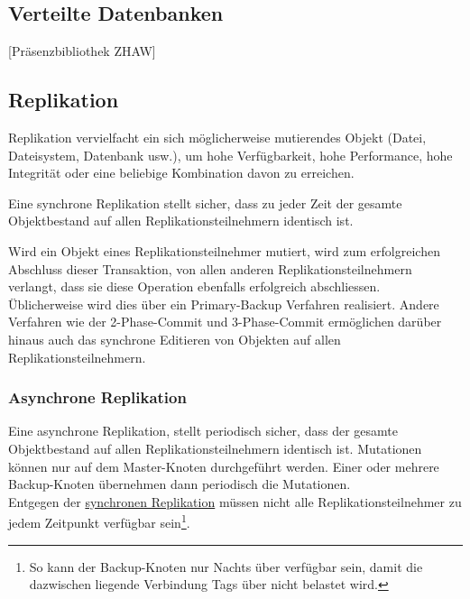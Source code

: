 \documentclass[oneside,11pt,parskip=half,ngerman]{scrreprt}
\begin{document}
\subsection{Verteilte Datenbanken}\label{verteilte-datenbanken}

{[}Präsenzbibliothek ZHAW{]}

\subsection{Replikation}\label{replikation}

Replikation vervielfacht ein sich möglicherweise mutierendes Objekt
(Datei, Dateisystem, Datenbank usw.), um hohe Verfügbarkeit, hohe
Performance, hohe Integrität oder eine beliebige Kombination davon zu
erreichen. \autocite[ p.~19]{SWB-327013990}


Eine synchrone Replikation stellt sicher, dass zu jeder Zeit der gesamte
Objektbestand auf allen Replikationsteilnehmern identisch ist.

Wird ein Objekt eines Replikationsteilnehmer mutiert, wird zum
erfolgreichen Abschluss dieser Transaktion, von allen anderen
Replikationsteilnehmern verlangt, dass sie diese Operation ebenfalls
erfolgreich abschliessen.\\Üblicherweise wird dies über ein
Primary-Backup Verfahren realisiert. Andere Verfahren wie der
2-Phase-Commit und 3-Phase-Commit ermöglichen darüber hinaus auch das
synchrone Editieren von Objekten auf allen Replikationsteilnehmern.
\autocite[ p.~23ff, 134ff]{SWB-327013990}

\subsubsection{Asynchrone Replikation}\label{asynchrone-replikation}

Eine asynchrone Replikation, stellt periodisch sicher, dass der gesamte
Objektbestand auf allen Replikationsteilnehmern identisch ist.
Mutationen können nur auf dem Master-Knoten durchgeführt werden. Einer
oder mehrere Backup-Knoten übernehmen dann periodisch die
Mutationen.\\Entgegen der \hyperref[synchrone-replikation]{synchronen
Replikation} müssen nicht alle Replikationsteilnehmer zu jedem Zeitpunkt
verfügbar sein\footnote{So kann der Backup-Knoten nur Nachts über
  verfügbar sein, damit die dazwischen liegende Verbindung Tags über
  nicht belastet wird.}.
\end{document}

